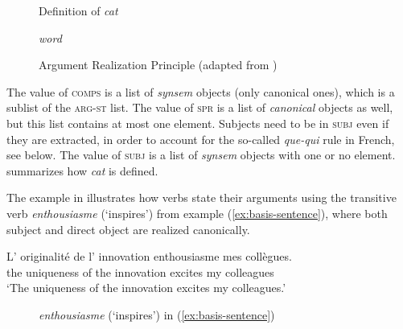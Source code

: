 \begin{figure}[ht]
    \caption{Definition of \emph{cat}}
    \label{fig:cat-definition}
\end{figure}

\begin{figure}[ht]
\textit{word} 
    \caption{Argument Realization Principle (adapted from \citealt[171]{Ginzburg.2000})}
    \label{avm:arp}
\end{figure}

The value of \textsc{comps} is a list of \emph{synsem} objects (only canonical ones), which is a sublist of the \textsc{arg-st} list. The value of \textsc{spr} is a list of \emph{canonical} objects as well, but this list contains at most one element. %
Subjects need to be in \textsc{subj} even if they are extracted, in order to account for the so-called \emph{que-qui} rule in French, see below. The value of \textsc{subj} is a list of \emph{synsem} objects with one or no element.  summarizes how \textit{cat} is defined.

The example in  illustrates how verbs state their arguments using the transitive verb \emph{enthousiasme} (`inspires') from example (\ref{ex:basis-sentence}), where both subject and direct object are realized canonically. 

\ea \gll L' originalité de l' innovation enthousiasme mes collègues.\\
the uniqueness of the innovation excites my colleagues\\
\glt `The uniqueness of the innovation excites my colleagues.'
\label{ex:basis-sentence}
\z 

\begin{figure}
\caption{\emph{enthousiasme} (`inspires') in (\ref{ex:basis-sentence}) \label{fig:ex:avm-enthousiasmer}}
\end{figure}



